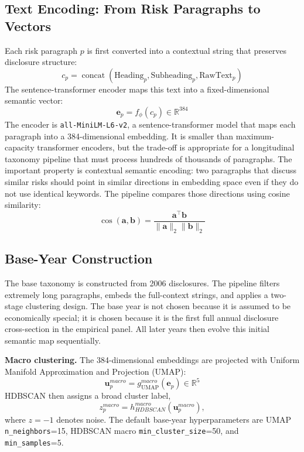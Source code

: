 \documentclass[11pt, a4paper]{article}
\begin{document}
\subsection{Text Encoding: From Risk Paragraphs to Vectors}
Each risk paragraph $p$ is first converted into a contextual string that preserves disclosure structure:
\begin{equation}
c_{p} = \operatorname{concat}(\text{Heading}_{p}, \text{Subheading}_{p}, \text{RawText}_{p})
\end{equation}
The sentence-transformer encoder maps this text into a fixed-dimensional semantic vector:
\begin{equation}
\mathbf{e}_{p} = f_{\phi}(c_{p}) \in \mathbb{R}^{384}
\end{equation}
The encoder is \texttt{all-MiniLM-L6-v2}, a sentence-transformer model that maps each paragraph into a 384-dimensional embedding. It is smaller than maximum-capacity transformer encoders, but the trade-off is appropriate for a longitudinal taxonomy pipeline that must process hundreds of thousands of paragraphs. The important property is contextual semantic encoding: two paragraphs that discuss similar risks should point in similar directions in embedding space even if they do not use identical keywords. The pipeline compares those directions using cosine similarity:
\begin{equation}
\cos(\mathbf{a},\mathbf{b}) = \frac{\mathbf{a}^{\top}\mathbf{b}}{\|\mathbf{a}\|_{2}\|\mathbf{b}\|_{2}}
\end{equation}

\subsection{Base-Year Construction}
The base taxonomy is constructed from 2006 disclosures. The pipeline filters extremely long paragraphs, embeds the full-context strings, and applies a two-stage clustering design. The base year is not chosen because it is assumed to be economically special; it is chosen because it is the first full annual disclosure cross-section in the empirical panel. All later years then evolve this initial semantic map sequentially.

\textbf{Macro clustering.} The 384-dimensional embeddings are projected with Uniform Manifold Approximation and Projection (UMAP):
\begin{equation}
\mathbf{u}_{p}^{macro} = g_{\text{UMAP}}^{macro}(\mathbf{e}_{p}) \in \mathbb{R}^{5}
\end{equation}
HDBSCAN then assigns a broad cluster label,
\begin{equation}
z^{macro}_{p}=h^{macro}_{HDBSCAN}(\mathbf{u}^{macro}_{p}),
\end{equation}
where $z=-1$ denotes noise. The default base-year hyperparameters are UMAP \texttt{n\_neighbors}=15, HDBSCAN macro \texttt{min\_cluster\_size}=50, and \texttt{min\_samples}=5.
\end{document}
